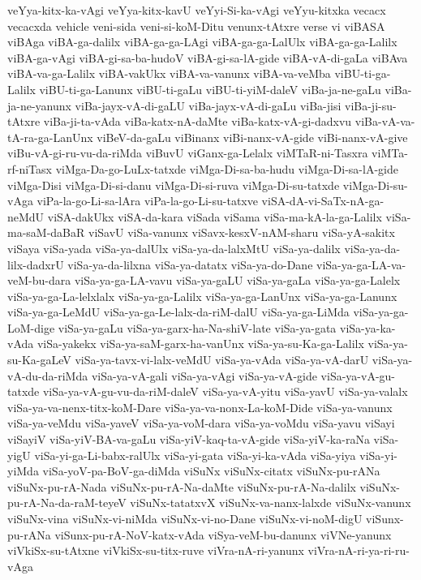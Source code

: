 {veYya-kitx-ka-vAgi
veYya-kitx-kavU
veYyi-Si-ka-vAgi
veYyu-kitxka
vecacx
vecacxda
vehicle
veni-sida
veni-si-koM-Ditu
venunx-tAtxre
verse
vi
viBASA
viBAga
viBA-ga-dalilx
viBA-ga-ga-LAgi
viBA-ga-ga-LalUlx
viBA-ga-ga-Lalilx
viBA-ga-vAgi
viBA-gi-sa-ba-hudoV
viBA-gi-sa-lA-gide
viBA-vA-di-gaLa
viBAva
viBA-va-ga-Lalilx
viBA-vakUkx
viBA-va-vanunx
viBA-va-veMba
viBU-ti-ga-Lalilx
viBU-ti-ga-Lanunx
viBU-ti-gaLu
viBU-ti-yiM-daleV
viBa-ja-ne-gaLu
viBa-ja-ne-yanunx
viBa-jayx-vA-di-gaLU
viBa-jayx-vA-di-gaLu
viBa-jisi
viBa-ji-su-tAtxre
viBa-ji-ta-vAda
viBa-katx-nA-daMte
viBa-katx-vA-gi-dadxvu
viBa-vA-va-tA-ra-ga-LanUnx
viBeV-da-gaLu
viBinanx
viBi-nanx-vA-gide
viBi-nanx-vA-give
viBu-vA-gi-ru-vu-da-riMda
viBuvU
viGanx-ga-Lelalx
viMTaR-ni-Tasxra
viMTa-rf-niTasx
viMga-Da-go-LuLx-tatxde
viMga-Di-sa-ba-hudu
viMga-Di-sa-lA-gide
viMga-Disi
viMga-Di-si-danu
viMga-Di-si-ruva
viMga-Di-su-tatxde
viMga-Di-su-vAga
viPa-la-go-Li-sa-lAra
viPa-la-go-Li-su-tatxve
viSA-dA-vi-SaTx-nA-ga-neMdU
viSA-dakUkx
viSA-da-kara
viSada
viSama
viSa-ma-kA-la-ga-Lalilx
viSa-ma-saM-daBaR
viSavU
viSa-vanunx
viSavx-kesxV-nAM-sharu
viSa-yA-sakitx
viSaya
viSa-yada
viSa-ya-dalUlx
viSa-ya-da-lalxMtU
viSa-ya-dalilx
viSa-ya-da-lilx-dadxrU
viSa-ya-da-lilxna
viSa-ya-datatx
viSa-ya-do-Dane
viSa-ya-ga-LA-va-veM-bu-dara
viSa-ya-ga-LA-vavu
viSa-ya-gaLU
viSa-ya-gaLa
viSa-ya-ga-Lalelx
viSa-ya-ga-La-lelxlalx
viSa-ya-ga-Lalilx
viSa-ya-ga-LanUnx
viSa-ya-ga-Lanunx
viSa-ya-ga-LeMdU
viSa-ya-ga-Le-lalx-da-riM-dalU
viSa-ya-ga-LiMda
viSa-ya-ga-LoM-dige
viSa-ya-gaLu
viSa-ya-garx-ha-Na-shiV-late
viSa-ya-gata
viSa-ya-ka-vAda
viSa-yakekx
viSa-ya-saM-garx-ha-vanUnx
viSa-ya-su-Ka-ga-Lalilx
viSa-ya-su-Ka-gaLeV
viSa-ya-tavx-vi-lalx-veMdU
viSa-ya-vAda
viSa-ya-vA-darU
viSa-ya-vA-du-da-riMda
viSa-ya-vA-gali
viSa-ya-vAgi
viSa-ya-vA-gide
viSa-ya-vA-gu-tatxde
viSa-ya-vA-gu-vu-da-riM-daleV
viSa-ya-vA-yitu
viSa-yavU
viSa-ya-valalx
viSa-ya-va-nenx-titx-koM-Dare
viSa-ya-va-nonx-La-koM-Dide
viSa-ya-vanunx
viSa-ya-veMdu
viSa-yaveV
viSa-ya-voM-dara
viSa-ya-voMdu
viSa-yavu
viSayi
viSayiV
viSa-yiV-BA-va-gaLu
viSa-yiV-kaq-ta-vA-gide
viSa-yiV-ka-raNa
viSa-yigU
viSa-yi-ga-Li-babx-ralUlx
viSa-yi-gata
viSa-yi-ka-vAda
viSa-yiya
viSa-yi-yiMda
viSa-yoV-pa-BoV-ga-diMda
viSuNx
viSuNx-citatx
viSuNx-pu-rANa
viSuNx-pu-rA-Nada
viSuNx-pu-rA-Na-daMte
viSuNx-pu-rA-Na-dalilx
viSuNx-pu-rA-Na-da-raM-teyeV
viSuNx-tatatxvX
viSuNx-va-nanx-lalxde
viSuNx-vanunx
viSuNx-vina
viSuNx-vi-niMda
viSuNx-vi-no-Dane
viSuNx-vi-noM-digU
viSunx-pu-rANa
viSunx-pu-rA-NoV-katx-vAda
viSya-veM-bu-danunx
viVNe-yanunx
viVkiSx-su-tAtxne
viVkiSx-su-titx-ruve
viVra-nA-ri-yanunx
viVra-nA-ri-ya-ri-ru-vAga
}
